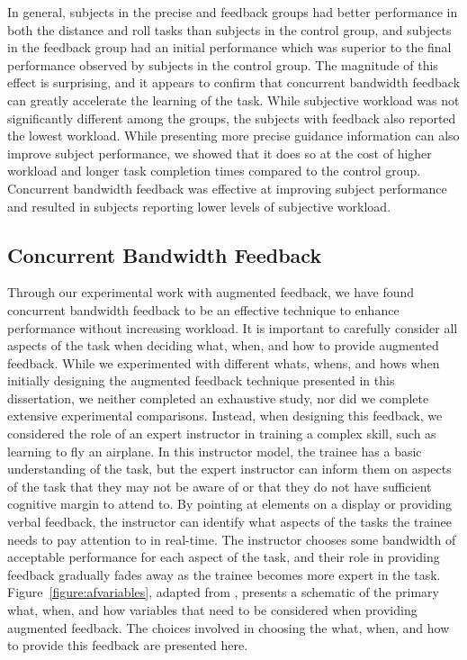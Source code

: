 In general, subjects in the precise and feedback groups had better performance in both the distance and roll tasks than subjects in the control group, and subjects in the feedback group had an initial performance which was superior to the final performance observed by subjects in the control group.
The magnitude of this effect is surprising, and it appears to confirm that concurrent bandwidth feedback can greatly accelerate the learning of the task.
While subjective workload was not significantly different among the groups, the subjects with feedback also reported the lowest workload.
While presenting more precise guidance information can also improve subject performance, we showed that it does so at the cost of higher workload and longer task completion times compared to the control group.
Concurrent bandwidth feedback was effective at improving subject performance and resulted in subjects reporting lower levels of subjective workload.

\subsection{Concurrent Bandwidth Feedback} \label{section:cbf}

Through our experimental work with augmented feedback, we have found concurrent bandwidth feedback to be an effective technique to enhance performance without increasing workload.
It is important to carefully consider all aspects of the task when deciding what, when, and how to provide augmented feedback.
While we experimented with different whats, whens, and hows when initially designing the augmented feedback technique presented in this dissertation, we neither completed an exhaustive study, nor did we complete extensive experimental comparisons.
Instead, when designing this feedback, we considered the role of an expert instructor in training a complex skill, such as learning to fly an airplane.
In this instructor model, the trainee has a basic understanding of the task, but the expert instructor can inform them on aspects of the task that they may not be aware of or that they do not have sufficient cognitive margin to attend to.
By pointing at elements on a display or providing verbal feedback, the instructor can identify what aspects of the tasks the trainee needs to pay attention to in real-time.
The instructor chooses some bandwidth of acceptable performance for each aspect of the task, and their role in providing feedback gradually fades away as the trainee becomes more expert in the task.
Figure~\ref{figure:afvariables}, adapted from \citeauthor{hodges2020skill}, presents a schematic of the primary what, when, and how variables that need to be considered when providing augmented feedback.
The choices involved in choosing the what, when, and how to provide this feedback are presented here.

